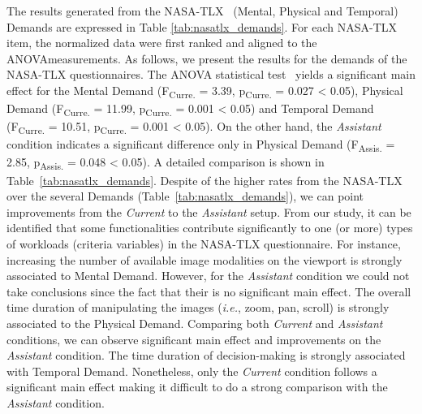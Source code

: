 The results generated from the NASA-TLX~\cite{grier2015high, ramkumar2017using} (Mental, Physical and Temporal) Demands are expressed in Table \ref{tab:nasatlx_demands}.
For each NASA-TLX item, the normalized data were first ranked and aligned to the ANOVA\footnotemark[12] measurements.
As follows, we present the results for the demands of the NASA-TLX questionnaires.
The ANOVA statistical test~\cite{Wobbrock:2011:ART:1978942.1978963, mathews2017usability} yields a significant main effect for the Mental Demand (F\textsubscript{Curre.} = 3.39, p\textsubscript{Curre.} = 0.027 < 0.05), Physical Demand (F\textsubscript{Curre.} = 11.99, p\textsubscript{Curre.} = 0.001 < 0.05) and Temporal Demand (F\textsubscript{Curre.} = 10.51, p\textsubscript{Curre.} = 0.001 < 0.05).
On the other hand, the {\it Assistant} condition indicates a significant difference only in Physical Demand (F\textsubscript{Assis.} = 2.85, p\textsubscript{Assis.} = 0.048 < 0.05). A detailed comparison is shown in Table~\ref{tab:nasatlx_demands}.
Despite of the higher rates from the NASA-TLX over the several Demands (Table~\ref{tab:nasatlx_demands}), we can point improvements from the {\it Current} to the {\it Assistant} setup.
From our study, it can be identified that some functionalities contribute significantly to one (or more) types of workloads (criteria variables) in the NASA-TLX questionnaire.
For instance, increasing the number of available image modalities on the viewport is strongly associated to Mental Demand.
However, for the {\it Assistant} condition we could not take conclusions since the fact that their is no significant main effect.
The overall time duration of manipulating the images ({\it i.e.}, zoom, pan, scroll) is strongly associated to the Physical Demand.
Comparing both {\it Current} and {\it Assistant} conditions, we can observe significant main effect and improvements on the {\it Assistant} condition.
The time duration of decision-making is strongly associated with Temporal Demand.
Nonetheless, only the {\it Current} condition follows a significant main effect making it difficult to do a strong comparison with the {\it Assistant} condition.


